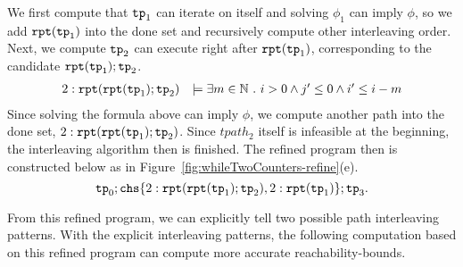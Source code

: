 We first compute that $\mathtt{tp}_1$ can iterate on itself and solving $\phi_1$ can imply
$\phi$, so we add $\mathtt{rpt}(\mathtt{tp}_1)$ into the done set and recursively
compute other interleaving order.
Next, we compute $\mathtt{tp}_2$ can execute right after $\mathtt{rpt}(\mathtt{tp}_1)$, corresponding
to the candidate $\mathtt{rpt}(\mathtt{tp}_1); \mathtt{tp}_2$.
\[
   \begin{array}{ll}
      2: \mathtt{rpt}(\mathtt{rpt}(\mathtt{tp}_1); \mathtt{tp}_2) & \models \exists m \in \mathbb{N} ~.~ i > 0 \land j' \leq 0 \land i' \leq i - m
   \end{array}
\]
Since solving the formula above can imply $\phi$, we compute another path into the done set, 
$2: \mathtt{rpt}(\mathtt{rpt}(\mathtt{tp}_1); \mathtt{tp}_2)$.
Since $tpath_2$ itself is infeasible at the beginning, the interleaving algorithm then is finished.
The refined program then is constructed below as in Figure~\ref{fig:whileTwoCounters-refine}(e).
\[
   \tpath_0 ; 
   \rpchoose{2: \rprepeat(\rprepeat(\tpath_1); \tpath_2), 
   2: \rprepeat(\tpath_1)}; \tpath_3.
\]

From this refined program, we can explicitly tell two possible path interleaving patterns.
With the explicit interleaving patterns, the following computation based on this refined program can compute more accurate reachability-bounds.
